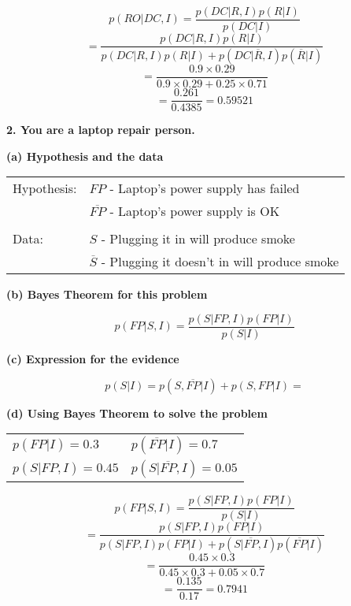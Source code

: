 \documentclass[a4paper, 12pt]{article}
\begin{document}
\begin{flushleft}
$$ p(RO | DC, I) = \frac{p(DC | R, I)p(R | I)}{p(DC|I)} $$
$$ = \frac{p(DC | R, I)p(R | I)}{p(DC | R,I)p(R | I) + p(DC | \overline{R}, I)p(\overline{R} | I)} $$
$$ = \frac{0.9 \times 0.29}{0.9 \times 0.29 + 0.25 \times0.71 } $$
$$ = \frac{0.261}{0.4385} = 0.59521  $$



\textbf{2. You are a laptop repair person.}

\textbf{(a) Hypothesis and the data } 

\begin{table}[ht]
    \centering
    \begin{tabular}{l l}
        Hypothesis: & $FP$ - Laptop’s power supply has failed  \\
                    & $\overline{FP}$ - Laptop’s power supply is OK\\
										& \\
        Data:       & $S$ - Plugging it in will produce smoke \\
                    & $\overline{S}$ - Plugging it doesn't in will produce smoke \\
    \end{tabular}
    \label{tab:hypdata}
\end{table}


\textbf{(b) Bayes Theorem for this problem} 

$$ p(FP | S, I) = \frac{p(S | FP, I)p(FP | I)}{p(S|I)} $$

\textbf{(c) Expression for the evidence}

$$ p(S | I) = p(S, \overline{FP} | I) + p(S, FP | I) = $$


\textbf{(d) Using Bayes Theorem to solve the problem} 

\begin{table}[ht]
    \centering
    \begin{tabular}{l l}
        $ p(FP | I) = 0.3 $    & $ p(\overline{FP} | I) = 0.7 $ \\
        $ p(S | FP, I) = 0.45 $ &  $ p(S | \overline{FP}, I) = 0.05 $ \\
    \end{tabular}
\end{table}

$$ p(FP | S, I) = \frac{p(S | FP, I)p(FP | I)}{p(S|I)} $$
$$ = \frac{p(S | FP, I)p(FP | I)}{p(S | FP,I)p(FP | I) + p(S | \overline{FP}, I)p(\overline{FP} | I)} $$
$$ = \frac{0.45 \times 0.3}{0.45 \times 0.3 + 0.05 \times0.7 } $$
$$ = \frac{0.135}{0.17} = 0.7941	  $$



\end{flushleft}
\end{document}
